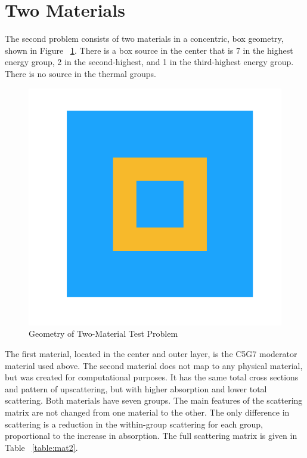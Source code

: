 \section{Two Materials}
The second problem consists of two materials in a concentric, box geometry, shown in Figure ~\ref{fig:test_geometry}. There is a box source in the center that is 7 in the highest energy group, 2 in the second-highest, and 1 in the third-highest energy group. There is no source in the thermal groups.

\begin{figure}[H]
    \centering
    \includegraphics[width=.3\textwidth]{fig/Geometry.png}
    \caption{Geometry of Two-Material Test Problem}
    \label{fig:test_geometry}
\end{figure}

The first material, located in the center and outer layer, is the C5G7 moderator material used above. The second material does not map to any physical material, but was created for computational purposes. It has the same total cross sections and pattern of upscattering, but with higher absorption and lower total scattering. Both materials have seven groups. The main features of the scattering matrix are not changed from one material to the other. The only difference in scattering is a reduction in the within-group scattering for each group, proportional to the increase in absorption. The full scattering matrix is given in Table ~\ref{table:mat2}.

